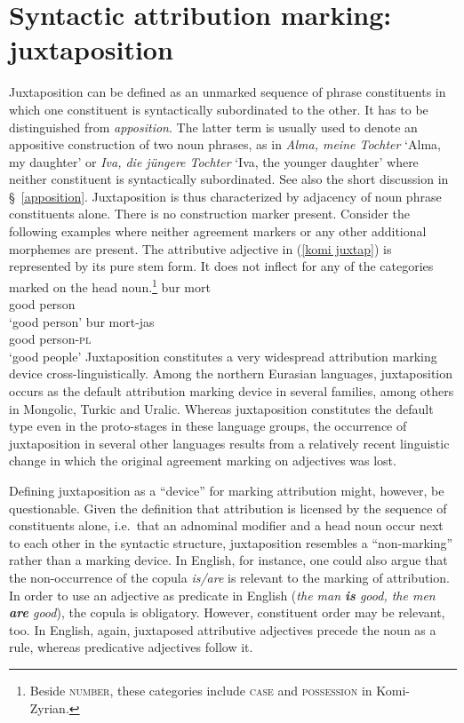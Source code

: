 \section[Juxtaposition]{Syntactic attribution marking: juxtaposition} \label{juxtaposition}
Juxtaposition can be defined as an unmarked sequence of phrase constituents in which one constituent is syntactically subordinated to the other. It has to be distinguished from \emph{apposition}. The latter term is usually used to denote an appositive construction of two noun phrases, as in \textit{Alma, meine Tochter} ‘Alma, my daughter’ or \textit{Iva, die jüngere Tochter} ‘Iva, the younger daughter’ where neither constituent is syntactically subordinated. See also the short discussion in \S~\ref{apposition}. Juxtaposition is thus characterized by adjacency of noun phrase constituents alone. There is no construction marker present. Consider the following  examples where neither agreement markers or any other additional morphemes are present. The attributive adjective in (\ref{komi juxtap}) is represented by its pure stem form. It does not inflect for any of the categories marked on the head noun.\footnote{Beside \textsc{number}, these categories include \textsc{case} and \textsc{possession} in Komi-Zyrian.}
\ea
\label{komi juxtap}
\ea
\gll 	bur 	mort\\
		good	person\\
\glt		‘good person’
\ex
\gll 	bur	mort-jas\\
		good	person-\textsc{pl}\\
\glt		‘good people’
\z
\z
Juxtaposition constitutes a very widespread attribution marking device cross-linguistically. Among the northern Eurasian languages, juxtaposition occurs as the default attribution marking device in several families, among others in Mongolic, Turkic and Uralic. Whereas juxtaposition constitutes the default type even in the proto-stages in these language groups, the occurrence of juxtaposition in several other languages results from a relatively recent linguistic change in which the original agreement marking on adjectives was lost.

Defining juxtaposition as a “device” for marking attribution might, however, be questionable. Given the definition that attribution is licensed by the sequence of constituents alone, i.e.~that an adnominal modifier and a head noun occur next to each other in the syntactic structure, juxtaposition resembles a “non-marking” rather than a marking device. In English, for instance, one could also argue that the non-occurrence of the copula \textit{is\slash{}are} is relevant to the marking of attribution. In order to use an adjective as predicate in English (\textit{the man \textbf{is} good, the men \textbf{are} good}), the copula is obligatory. However, constituent order may be relevant, too. In English, again, juxtaposed attributive adjectives precede the noun as a rule, whereas predicative adjectives follow it. 

